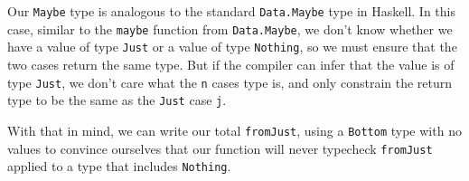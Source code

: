 \documentclass[]{article}
\newenvironment{Shaded}{}{}
\newcommand{\KeywordTok}[1]{\textcolor[rgb]{0.00,0.44,0.13}{\textbf{{#1}}}}
\newcommand{\DataTypeTok}[1]{\textcolor[rgb]{0.56,0.13,0.00}{{#1}}}
\newcommand{\StringTok}[1]{\textcolor[rgb]{0.25,0.44,0.63}{{#1}}}
\newcommand{\OtherTok}[1]{\textcolor[rgb]{0.00,0.44,0.13}{{#1}}}
\newcommand{\FunctionTok}[1]{\textcolor[rgb]{0.02,0.16,0.49}{{#1}}}
\newcommand{\NormalTok}[1]{{#1}}
\begin{document}
\begin{Shaded}
\end{Shaded}

Our \texttt{Maybe} type is analogous to the standard \texttt{Data.Maybe}
type in Haskell. In this case, similar to the \texttt{maybe} function
from \texttt{Data.Maybe}, we don't know whether we have a value of type
\texttt{Just} or a value of type \texttt{Nothing}, so we must ensure
that the two cases return the same type. But if the compiler can infer
that the value is of type \texttt{Just}, we don't care what the
\texttt{n} cases type is, and only constrain the return type to be the
same as the \texttt{Just} case \texttt{j}.

With that in mind, we can write our total \texttt{fromJust}, using a
\texttt{Bottom} type with no values to convince ourselves that our
function will never typecheck \texttt{fromJust} applied to a type that
includes \texttt{Nothing}.

\begin{Shaded}
\end{Shaded}
\end{document}
